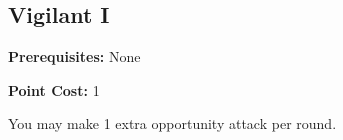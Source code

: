 \subsection{Vigilant I}\label{feat:vigilant1}

\noindent
\textbf{Prerequisites:} None

\noindent
\textbf{Point Cost:} 1

You may make 1 extra opportunity attack per round.

